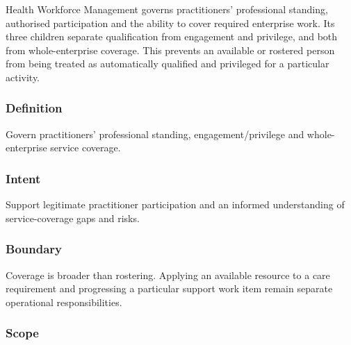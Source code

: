 Health Workforce Management governs practitioners' professional standing, authorised participation and the ability to cover required enterprise work. Its three children separate qualification from engagement and privilege, and both from whole-enterprise coverage. This prevents an available or rostered person from being treated as automatically qualified and privileged for a particular activity.

\subsubsection*{Definition}

Govern practitioners’ professional standing, engagement/\allowbreak{}privilege and whole-enterprise service coverage.

\subsubsection*{Intent}

Support legitimate practitioner participation and an informed understanding of service-coverage gaps and risks.

\subsubsection*{Boundary}

Coverage is broader than rostering. Applying an available resource to a care requirement and progressing a particular support work item remain separate operational responsibilities.

\subsubsection*{Scope}

